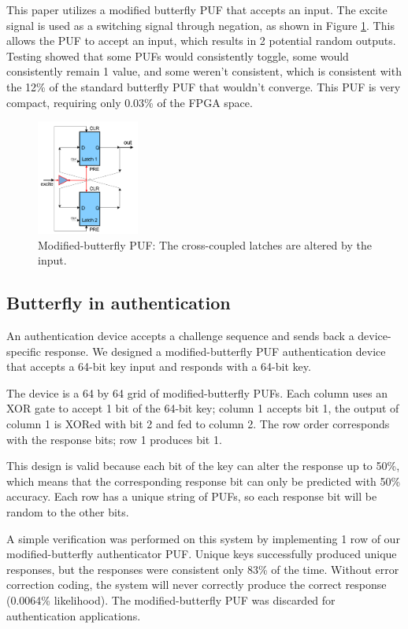	This paper utilizes a modified butterfly PUF that accepts an input. The excite signal is used as a switching signal through negation, as shown in Figure \ref{fig:bfly2}. This allows the PUF to accept an input, which results in 2 potential random outputs. Testing showed that some PUFs would consistently toggle, some would consistently remain 1 value, and some weren't consistent, which is consistent with the 12\% of the standard butterfly PUF that wouldn't converge. This PUF is very compact, requiring only 0.03\% of the FPGA space. 
		\begin{figure}[tbph]
			\centering
			\includegraphics[width=0.3\textwidth]{bfly2.png}
			\caption{Modified-butterfly PUF: The cross-coupled latches are altered by the input.}\label{fig:bfly2}
		\end{figure}
		

	\subsection{Butterfly in authentication}
		An authentication device accepts a challenge sequence and sends back a device-specific response. We designed a modified-butterfly PUF authentication device that accepts a 64-bit key input and responds with a 64-bit key. 

		The device is a 64 by 64 grid of modified-butterfly PUFs. Each column uses an XOR gate to accept 1 bit of the 64-bit key; column 1 accepts bit 1, the output of column 1 is XORed with bit 2 and fed to column 2. The row order corresponds with the response bits; row 1 produces bit 1. 

		This design is valid because each bit of the key can alter the response up to 50\%, which means that the corresponding response bit can only be predicted with 50\% accuracy. Each row has a unique string of PUFs, so each response bit will be random to the other bits. 

		A simple verification was performed on this system by implementing 1 row of our modified-butterfly authenticator PUF. Unique keys successfully produced unique responses, but the responses were consistent only 83\% of the time. Without error correction coding, the system will never correctly produce the correct response (0.0064\% likelihood). The modified-butterfly PUF was discarded for authentication applications. 


